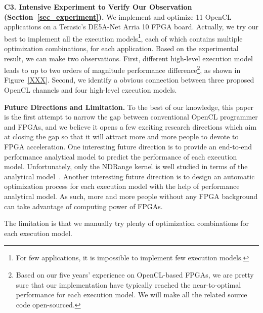%
\vspace{0.4em}
\noindent
{\bf C3. Intensive Experiment to Verify Our Observation (Section~\ref{sec_experiment}). }We implement and optimize 11 OpenCL applications on a Terasic\textquoteright s DE5A-Net Arria 10 FPGA board. Actually, we try our best to implement all the execution models\footnote{For few applications, it is impossible to implement few execution models.}, each of which contains multiple optimization combinations, for each application. Based on the experimental result, we can make two observations. First, different high-level execution model leads to up to two orders of magnitude performance difference\footnote{Based on our five years' experience on OpenCL-based FPGAs, we are pretty sure that our implementation have typically reached the near-to-optimal performance for each execution model. We will make all the related source code open-sourced. }, as shown in Figure~\ref{XXX}. Second, we identify a obvious connection between three proposed OpenCL channels and four high-level execution models. %


\vspace{1em}
\noindent
{\bf Future Directions and Limitation.} 
To the best of our knowledge, this paper is the first attempt to narrow the gap between conventional OpenCL programmer and FPGAs, and we believe it opens a few exciting research directions which aim at closing the gap so that it will attract more and more people to devote to FPGA acceleration. One interesting future direction is to provide an end-to-end performance analytical model to predict the performance of each execution model. Unfortunately, only the NDRange kernel is well studied in terms of the analytical model~\cite{fpga_opencl_model_hpca16, flexcl_tc18}. 
Another interesting future direction is to design an automatic optimization process for each execution model with the help of performance analytical model. As such, more and more people without any FPGA background can take advantage of computing power of FPGAs. 


The limitation is that we manually try plenty of optimization combinations for each execution model. %

